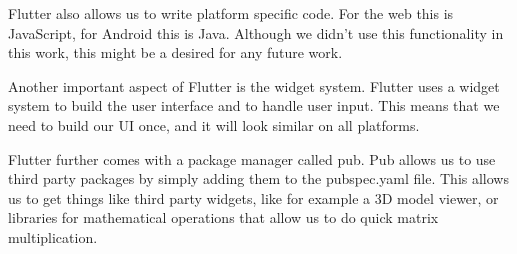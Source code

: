 Flutter also allows us to write platform specific code. For the web this is JavaScript, for Android this is Java. Although we didn't use this functionality in this work, this might be a desired for
any future work.

Another important aspect of Flutter is the widget system. Flutter uses a widget system to build the user interface and to handle user input. This means that we need to build our UI once, and it will
look similar on all platforms. 

Flutter further comes with a package manager called pub. Pub allows us to use third party packages by simply adding them to the pubspec.yaml file. This allows us to get things like third party widgets, 
like for example a 3D model viewer, or libraries for mathematical operations that allow us to do quick matrix multiplication.


